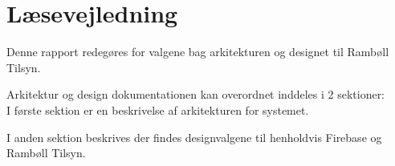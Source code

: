 \chapter*{Læsevejledning}
Denne rapport redegøres for valgene bag arkitekturen og designet til Rambøll Tilsyn. 

Arkitektur og design dokumentationen kan overordnet inddeles i 2 sektioner:\\
I første sektion er en beskrivelse af arkitekturen for systemet.

I anden sektion beskrives der findes designvalgene til henholdvis Firebase og Rambøll Tilsyn.
